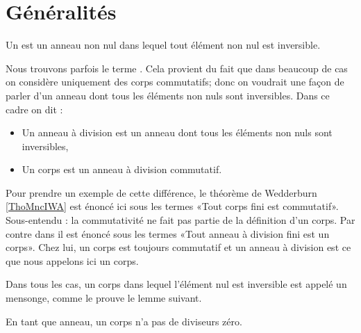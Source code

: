 
\section{Généralités}

\begin{definition}  \label{DefTMNooKXHUd}
    Un  est un anneau non nul dans lequel tout élément non nul est inversible.
\end{definition}

\begin{remark}
    Nous trouvons parfois le terme . Cela provient du fait que dans beaucoup de cas on considère uniquement des corps commutatifs; donc on voudrait une façon de parler d'un anneau dont tous les éléments non nuls sont inversibles. Dans ce cadre on dit :
    \begin{itemize}
        \item Un anneau à division est un anneau dont tous les éléments non nuls sont inversibles,
        \item Un corps est un anneau à division commutatif.
    \end{itemize}
    Pour prendre un exemple de cette différence, le théorème de Wedderburn \ref{ThoMncIWA} est énoncé ici sous les termes «Tout corps fini est commutatif». Sous-entendu : la commutativité ne fait pas partie de la définition d'un corps. Par contre dans \cite{KXjFWKA} il est énoncé sous les termes «Tout anneau à division fini est un corps». Chez lui, un corps est toujours commutatif et un anneau à division est ce que nous appelons ici un corps.
    
    Dans tous les cas, un corps dans lequel l'élément nul est inversible est appelé un mensonge, comme le prouve le lemme suivant.
\end{remark}

\begin{lemma}       \label{LemAnnCorpsnonInterdivzer}
    En tant que anneau, un corps n'a pas de diviseurs zéro.
\end{lemma}

